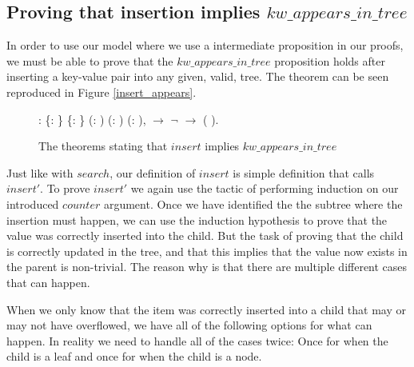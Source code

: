 \subsection{Proving that insertion implies $kw\_appears\_in\_tree$}
\label{sec:proving_insert_appears}

In order to use our model where we use a intermediate proposition in our proofs, we must be able to prove that the $kw\_appears\_in\_tree$ proposition holds after inserting a key-value pair into any given, valid, tree. The theorem can be seen reproduced in Figure \ref{insert_appears}.

\begin{figure}
  \begin{coqdoccode}
  \coqdocnoindent
    : \coqdockw{\ensuremath{\forall}} \{: \} \{: \} (:   ) (: ) (: ),\coqdoceol
  \coqdocindent{1.00em}
      \ensuremath{\rightarrow} \coqdoceol
  \coqdocindent{1.00em}
  \ensuremath{\lnot}   \ensuremath{\rightarrow} \coqdoceol
  \coqdocindent{1.00em}
     (   ).\coqdoceol
  \end{coqdoccode}
  \caption{The theorems stating that $insert$ implies $kw\_appears\_in\_tree$}
  \label{fig:insert_appears}
\end{figure}

Just like with $search$, our definition of $insert$ is simple definition that calls $insert'$. To prove $insert'$ we again use the tactic of performing induction on our introduced $counter$ argument. Once we have identified the the subtree where the insertion must happen, we can use the induction hypothesis to prove that the value was correctly inserted into the child. But the task of proving that the child is correctly updated in the tree, and that this implies that the value now exists in the parent is non-trivial. The reason why is that there are multiple different cases that can happen. 

When we only know that the item was correctly inserted into a child that may or may not have overflowed, we have all of the following options for what can happen. In reality we need to handle all of the cases twice: Once for when the child is a leaf and once for when the child is a node.

